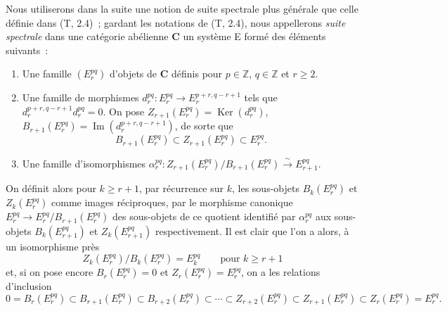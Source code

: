 \begin{env}[11.1.1]
\label{0.11.1.1-fr}
Nous utiliserons dans la suite une notion de suite spectrale plus générale que
celle définie dans (T, 2.4)~; gardant les notations de (T, 2.4), nous
appellerons \emph{suite spectrale} dans une catégorie abélienne $\boldsymbol{C}$ un
système E formé des éléments suivants~:
\begin{enumerate}
  \item[$a)$] Une famille $(E_r^{pq})$ d'objets de $\boldsymbol{C}$ définis pour
    $p\in\mathbb Z$, $q\in\mathbb Z$ et $r\geq2$.
  \item[$b)$] Une famille de morphismes
    $d_r^{pq}:E_r^{pq}\to E_r^{p+r,q-r+1}$ tels que
    $d_r^{p+r,q-r+1}d_r^{pq}=0$. On pose
    $Z_{r+1}(E_r^{pq})=\operatorname{Ker}(d_r^{pq})$,
    $B_{r+1}(E_r^{pq})=\operatorname{Im}(d_r^{p+r,q-r+1})$, de sorte que
    \[
      B_{r+1}(E_r^{pq})\subset Z_{r+1}(E_r^{pq})\subset E_r^{pq}.
    \]
  \item[$c)$] Une famille d'isomorphismes
    $\alpha_r^{pq}:Z_{r+1}(E_r^{pq})/B_{r+1}(E_r^{pq})
    \xrightarrow{\sim}E_{r+1}^{pq}$.
\end{enumerate}

On définit alors pour $k\geq r+1$, par récurrence sur $k$, les sous-objets
$B_k(E_r^{pq})$ et $Z_k(E_r^{pq})$ comme images réciproques, par le morphisme
canonique $E_r^{pq}\to E_r^{pq}/B_{r+1}(E_r^{pq})$ des sous-objets de ce
quotient identifié par $\alpha_r^{pq}$ aux sous-objets $B_k(E_{r+1}^{pq})$ et
$Z_k(E_{r+1}^{pq})$ respectivement. Il est clair que l'on a alors, à un
isomorphisme près
\[
\label{0.11.1.1.1-fr}
  Z_k(E_r^{pq})/B_k(E_r^{pq})=E_k^{pq}
  \qquad\text{pour }k\geq r+1
  \tag{11.1.1.1}
\]
et, si on pose encore $B_r(E_r^{pq})=0$ et $Z_r(E_r^{pq})=E_r^{pq}$, on a
les relations d'inclusion
\[
\label{0.11.1.1.2-fr}
  0=B_r(E_r^{pq})\subset B_{r+1}(E_r^{pq})\subset B_{r+2}(E_r^{pq})
  \subset\cdots\subset Z_{r+2}(E_r^{pq})\subset Z_{r+1}(E_r^{pq})
  \subset Z_r(E_r^{pq})=E_r^{pq}.
  \tag{11.1.1.2}
\]


\end{env}
